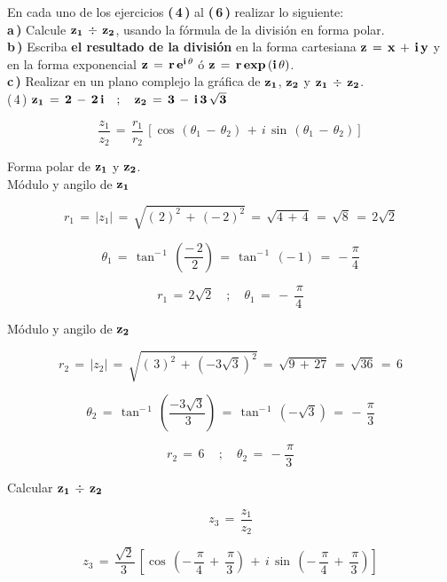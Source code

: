 \documentclass[a4paper,11pt,openany]{book}
\begin{document}
En cada uno de los ejercicios \textbf{(\,4\,)} al \textbf{(\,6\,)} realizar lo siguiente:\\

\textbf{a\,)} Calcule $\bf{z_{1}\,\div\,z_{2}}$, usando la fórmula de la división en forma polar.\\

\textbf{b\,)} Escriba \textbf{el resultado de la división} en la forma cartesiana $\bf{z\,=\,x\,+\,i\,y}$ y en la forma exponencial $\bf{z\,=\,r\,e^{i\,\theta}}$ ó $\bf{z\,=\,r\,exp\,(i\,\theta)}$.\\

\textbf{c\,)} Realizar en un plano complejo la gráfica de $\bf{z_{1}}$, $\bf{z_{2}}$ y $\bf{z_{1}\,\div\,z_{2}}$.\\

\textcolor{ao(english)}{(\,4\,)} $\bf{z_{1}\,=\,2\,-\,2\,i \quad;\quad z_{2}\,=\,3\,-\,i\,3\,\sqrt{3}}$



$$\dfrac{z_{1}}{z_{2}}\,=\,\dfrac{r_{1}}{r_{2}}\,\left[\cos\,(\theta_{1}\,-\,\theta_{2})\,+\,i\,\sin\,(\theta_{1}\,-\,\theta_{2})\right]$$

\textcolor{ao(english)}{} Forma polar de $\bf{z_{1}}$ y $\bf{z_{2}}$.\\

\textcolor{ao(english)}{} Módulo y angilo de $\bf{z_{1}}$ 

$$r_{1}\,=\,|z_{1}|\,=\,\sqrt{(\,2)^{2}\,+\,(-\,2)^{2}}\,=\,\sqrt{4\,+\,4}\,=\,\sqrt{8}\,=\,2\sqrt{2}$$

$$\theta_{1}\,=\,\tan^{-\,1}\,\left(\dfrac{-\,2}{\,2}\right)\,=\,\tan^{-\,1}\,(-\,1)\,=\,-\dfrac{\pi}{4}$$


$$\boxed{r_{1}\,=\,2\sqrt{2} \quad;\quad \theta_{1}\,=\,-\,\dfrac{\,\pi}{4}}$$

\textcolor{ao(english)}{} Módulo y angilo de $\bf{z_{2}}$ 

$$r_{2}\,=\,|z_{2}|\,=\,\sqrt{(\,3)^{2}\,+\,(-3\sqrt{3})^{2}}\,=\,\sqrt{9\,+\,27}\,=\,\sqrt{36}\,=\,6$$

$$\theta_{2}\,=\,\tan^{-\,1}\,\left(\dfrac{-3\sqrt{3}}{\,3}\right)\,=\,\tan^{-\,1}\,(-\sqrt{3})\,=\,-\,\dfrac{\pi}{3}$$

$$\boxed{r_{2}\,=\,6\, \quad;\quad \theta_{2}\,=\,-\dfrac{\,\pi}{3}}$$

\textcolor{ao(english)}{} Calcular $\bf{z_{1}\,\div\,z_{2}}$

$$z_{3}\,=\,\dfrac{z_{1}}{z_{2}}$$

$$z_{3}\,=\,\dfrac{\sqrt{2}}{3\,}\,\left[\cos\,\left(-\,\dfrac{\,\pi}{4}\,+\,\dfrac{\,\pi}{3}\right)\,+\,i\,\sin\,\left(-\,\dfrac{\,\pi}{4}\,+\,\dfrac{\,\pi}{3}\right)\right]$$
\end{document}

